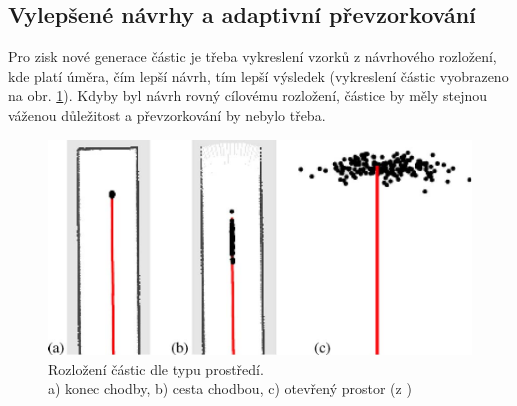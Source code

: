\documentclass[12pt]{report}
\begin{document}
\subsection{Vylepšené návrhy a adaptivní převzorkování}
Pro zisk nové generace částic je třeba vykreslení vzorků z návrhového rozložení, kde platí úměra, čím lepší návrh, tím lepší výsledek (vykreslení částic vyobrazeno na obr. \ref{fig:gmapping_particles}). Kdyby byl návrh rovný cílovému rozložení, částice by měly stejnou váženou důležitost a převzorkování by nebylo třeba. \\

\begin{figure}[!ht]
	\begin{center}
		\includegraphics[width=0.7\columnwidth]{imgs/gmapping_particles.pdf}
	\end{center}
	\caption{Rozložení částic dle typu prostředí.\\
		a) konec chodby, b) cesta chodbou, c) otevřený prostor (z \cite{Kohlbrecher2011})}
	\label{fig:gmapping_particles}
\end{figure}
\end{document}
